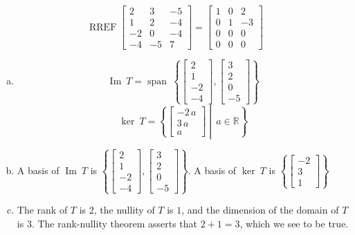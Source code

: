 \begin{exerciseAnswer} 


\[\operatorname{RREF} \left[\begin{array}{ccc}
2 & 3 & -5 \\
1 & 2 & -4 \\
-2 & 0 & -4 \\
-4 & -5 & 7
\end{array}\right] = \left[\begin{array}{ccc}
1 & 0 & 2 \\
0 & 1 & -3 \\
0 & 0 & 0 \\
0 & 0 & 0
\end{array}\right] \]


\begin{enumerate}[(a)]
\item \[\operatorname{Im}\ T = \operatorname{span}\  \left\{ \left[\begin{array}{c}
2 \\
1 \\
-2 \\
-4
\end{array}\right] , \left[\begin{array}{c}
3 \\
2 \\
0 \\
-5
\end{array}\right] \right\} \]\[\operatorname{ker}\ T =  \left\{ \left[\begin{array}{c}
-2 \, a \\
3 \, a \\
a
\end{array}\right] \middle|\,a\in\mathbb{R}\right\} \]
\item  A basis of \(\operatorname{Im}\ T\) is \( \left\{ \left[\begin{array}{c}
2 \\
1 \\
-2 \\
-4
\end{array}\right] , \left[\begin{array}{c}
3 \\
2 \\
0 \\
-5
\end{array}\right] \right\} \). A basis of \(\operatorname{ker}\ T\) is \( \left\{ \left[\begin{array}{c}
-2 \\
3 \\
1
\end{array}\right] \right\} \)
\item  The rank of \(T\) is \( 2 \), the nullity of \(T\) is \( 1 \), and the dimension of the domain of \(T\) is \( 3 \). The rank-nullity theorem asserts that \( 2 + 1 = 3 \), which we see to be true. 
\end{enumerate}
    
\end{exerciseAnswer}
    
